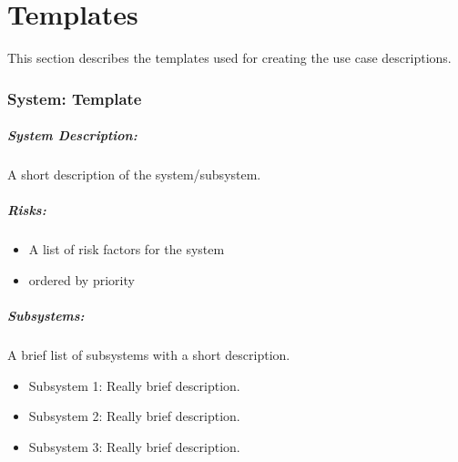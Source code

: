 
\appendix


\chapter{Templates}

This section describes the templates used for creating the use case descriptions.

\subsection{System: Template}
\label{System: Template}



\begin{figure} [htb]
	\centering
	\caption{}
	\label{fig:uc generic data}
\end{figure}


\paragraph{System Description:}
A short description of the system/subsystem.

\paragraph{Risks:}
\begin{itemize}
	\item A list of risk factors for the system
	\item ordered by priority
\end{itemize}


\paragraph{Subsystems:} A brief list of subsystems with a short description.

\begin{itemize}
	\item Subsystem 1: Really brief description.
	\item Subsystem 2: Really brief description.
	\item Subsystem 3: Really brief description.
\end{itemize}


